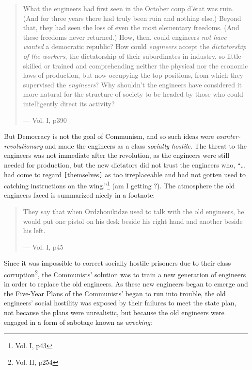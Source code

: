 \documentclass{article}
\begin{document}
\begin{quote}
What the engineers had first seen in the October coup d'\'etat was ruin.  (And for three years there had truly been ruin and nothing else.)  Beyond that, they had seen the loss of even the most elementary freedoms.  (And these freedoms never returned.)  How, then, could engineers \emph{not have wanted} a democratic republic?  How could \emph{engineers} accept the \emph{dictatorship of the workers}, the dictatorship of their subordinates in industry, so little skilled or trained and comprehending neither the physical nor the economic laws of production, but now occupying the top positions, from which they supervised the \emph{engineers}?  Why shouldn't the engineers have considered it more natural for the structure of society to be headed by those who could intelligently direct its activity?

--- Vol. I, p390
\end{quote}

But Democracy is not the goal of Communism, and so such ideas were \emph{counter-revolutionary} and made the engineers as a class \emph{socially hostile}.  The threat to the engineers was not immediate after the revolution, as the engineers were still needed for production, but the new dictators did not trust the engineers who, ``\ldots had come to regard \verb|[|themselves\verb|]| as too irreplaceable and had not gotten used to catching instructions on the wing.''\footnote{Vol. I, p43} (am I getting ?).  The atmosphere the old engineers faced is summarized nicely in a footnote:

\begin{quote}
They say that when Ordzhonikidze used to talk with the old engineers, he would put one pistol on his desk beside his right hand and another beside his left.

--- Vol. I, p45
\end{quote}

Since it was impossible to correct socially hostile prisoners due to their class corruption\footnote{Vol. II, p254}, the Communists' solution was to train a new generation of engineers in order to replace the old engineers.  As these new engineers began to emerge and the Five-Year Plans of the Communists' began to run into trouble, the old engineers' social hostility was exposed by their failures to meet the state plan, not because the plans were unrealistic, but because the old engineers were engaged in a form of sabotage known as \emph{wrecking}:
\end{document}
